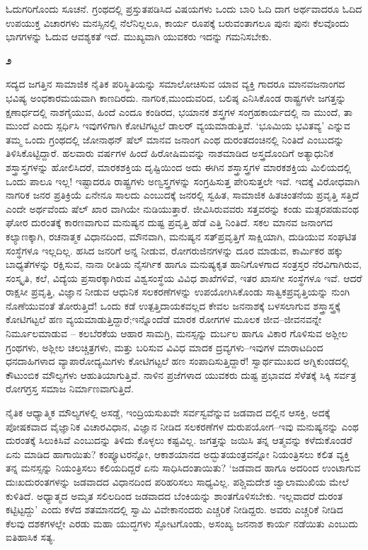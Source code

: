 ಓದುಗರಿಗೊಂದು ಸೂಚನೆ. ಗ್ರಂಥದಲ್ಲಿ ಪ್ರಸ್ತುತಪಡಿಸಿದ ವಿಷಯಗಳು ಒಂದು ಬಾರಿ ಓದಿ ದಾಗ ಅರ್ಥವಾದರೂ ಓದಿದ ಉಪಯುಕ್ತ ವಿಚಾರಗಳು ಮನಸ್ಸಿನಲ್ಲಿ ನೆಲೆನಿಲ್ಲಲೂ, ಕಾರ್ಯ ರೂಪಕ್ಕೆ ಬರುವಂತಾಗಲೂ ಪುನಃ ಪುನಃ ಕೆಲವೊಂದು ಭಾಗಗಳನ್ನು ಓದುವ ಆವಶ್ಯಕತೆ ಇದೆ. ಮುಖ್ಯವಾಗಿ ಯುವಕರು ಇದನ್ನು ಗಮನಿಸಬೇಕು.

\medskip\centerline{{\Large\bfseries ೨}}

ಸದ್ಯದ ಜಗತ್ತಿನ ಸಾಮಾಜಿಕ ನೈತಿಕ ಪರಿಸ್ಥಿತಿಯನ್ನು ಸಮಾಲೋಚಿಸುವ ಯಾವ ವ್ಯಕ್ತಿ ಗಾದರೂ ಮಾನವಜನಾಂಗದ ಭವಿಷ್ಯ ಅಂಧಕಾರಮಯವಾಗಿ ಕಾಣದಿರದು. ನಾಗರಿಕ,\break ಮುಂದುವರಿದ, ಬಲಿಷ್ಠ ಎನಿಸಿಕೊಂಡ ರಾಷ್ಟ್ರಗಳೇ ಜಗತ್ತನ್ನು ಕ್ಷಣಾರ್ಧದಲ್ಲಿ ನಾಶಗೈಯುವ, ಹಿಂದೆ ಎಂದೂ ಕಂಡಿರದ, ಭಯಾನಕ ಶಸ್ತ್ರಗಳ ಸಂಗ್ರಹಕಾರ್ಯದಲ್ಲಿ ನಾ ಮುಂದೆ, ತಾ ಮುಂದೆ ಎಂದು ಸ್ಪರ್ಧಿಸಿ ಇವುಗಳಿಗಾಗಿ ಕೋಟಿಗಟ್ಟಲೆ ಡಾಲರ್ ವ್ಯಯಮಾಡುತ್ತಿವೆ. ‘ಭೂಮಿಯ ಭವಿತವ್ಯ’ ಎನ್ನುವ ತಮ್ಮ ಒಂದು ಗ್ರಂಥದಲ್ಲಿ ಜೋನಾಥನ್ ಷೆಲ್ ಮಾನವ ಜನಾಂಗ ಎಂಥ ದುರಂತದಂಚಿನಲ್ಲಿ ನಿಂತಿದೆ ಎಂಬುದನ್ನು ತಿಳಿಸಿಕೊಟ್ಟಿದ್ದಾರೆ. ಹಲವಾರು ವರ್ಷಗಳ ಹಿಂದೆ ಹಿರೋಷಿಮವನ್ನು ನಾಶಮಾಡಿದ ಅಸ್ತ್ರದೊಂದಿಗೆ ಅತ್ಯಾಧುನಿಕ ಶಸ್ತ್ರಾಸ್ತ್ರಗಳನ್ನು ಹೋಲಿಸಿದರೆ, ಮಾರಕಶಕ್ತಿಯ ದೃಷ್ಟಿಯಿಂದ ಅದು ಈಗಿನ ಶಸ್ತ್ರಾಸ್ತ್ರಗಳ ಮಾರಕಶಕ್ತಿಯ ಮಿಲಿಯದಲ್ಲಿ ಒಂದು ಪಾಲೂ ಇಲ್ಲ! ಇಷ್ಟಾದರೂ ರಾಷ್ಟ್ರಗಳು ಅಣ್ವಸ್ತ್ರಗಳನ್ನು ಸಂಗ್ರಹಿಸುತ್ತ ಪೇರಿಸುತ್ತಲೇ ಇವೆ. ಇದಕ್ಕೆ ವಿರೋಧವಾಗಿ ನಾಗರಿಕ ಜನರ ಪ್ರತಿಕ್ರಿಯೆ ಏನೇನೂ ಸಾಲದು ಎಂಬುದಕ್ಕೆ ಜನರಲ್ಲಿ ಸ್ವಹಿತ, ಸಾಮಾಜಿಕ ಹಿತಚಿಂತನೆಯ ಪ್ರವೃತ್ತಿ ಸತ್ತಿದೆ ಎಂದೇ ಅರ್ಥವೆಂದು ಷೆಲ್ ಖಾರ ವಾಗಿಯೇ ನುಡಿಯುತ್ತಾರೆ. ಜೀವಿಸಿರುವವರು ಸತ್ತವರನ್ನು ಕಂಡು ಮತ್ಸರಪಡುವಂಥ ಘೋರ ದುರಂತಕ್ಕೆ ಕಾರಣವಾಗುವ ಮನುಷ್ಯನ ದುಷ್ಟ ಪ್ರವೃತ್ತಿ ಹೆಡೆ ಎತ್ತಿ ನಿಂತಿದೆ. ಸಕಲ ಮಾನವ ಜನಾಂಗದ ಕಲ್ಯಾಣಕ್ಕಾಗಿ, ರಚನಾತ್ಮಕ ವಿಧಾನದಿಂದ, ಮೌನವಾಗಿ, ಮನುಷ್ಯನ ಸತ್​ಪ್ರವೃತ್ತಿಗೆ ಸಾಕ್ಷಿಯಾಗಿ, ದುಡಿಯುವ ಸಂಘಟಿತ ಸಂಸ್ಥೆಗಳೂ ಇಲ್ಲದಿಲ್ಲ. ಹಸಿದ ಜನರಿಗೆ ಅನ್ನ ನೀಡುವ, ರೋಗರುಜಿನಗಳನ್ನು ದೂರ ಮಾಡುವ, ಕಾರ್ಮಿಕರ ಹಕ್ಕು ಬಾಧ್ಯತೆಗಳನ್ನು ರಕ್ಷಿಸುವ, ನಾನಾ ರೀತಿಯ ನೈಸರ್ಗಿಕ ಹಾಗೂ ಮನುಷ್ಯಕೃತ ಹಾನಿಗೊಳಗಾದ ಸಂತ್ರಸ್ತರ ನೆರವಿಗಾಗಿರುವ, ಸಂಸ್ಕೃತಿ, ಕಲೆ, ವಿದ್ಯೆಯ ಪ್ರಸಾರಕ್ಕಾಗಿರುವ ವಿಶ್ವಸಂಸ್ಥೆಯ ವಿವಿಧ ಶಾಖೆಗಳಿವೆ, ಇತರ ಖಾಸಗೀ ಸಂಸ್ಥೆಗಳೂ ಇವೆ. ಆದರೆ ರಾಕ್ಷಸೀ ಪ್ರವೃತ್ತಿ, ವಿಜ್ಞಾನ ನೀಡುವ ಆಧುನಿಕ ಸಲಕರಣೆಗಳನ್ನು ಉಪಯೋಗಿಸಿಕೊಂಡು ಸಾತ್ವಿಕಪ್ರವೃತ್ತಿಯನ್ನು ನುಂಗಿ ನೊಣೆಯುವಂತೆ ತೋರುತ್ತಿದೆ! ಒಂದು ಕಡೆ ಉತ್ಪತ್ತಿದಾಯಕವಲ್ಲದ ಕೇವಲ ಜನನಾಶಕ್ಕೆ ಬಳಸಲಾಗುವ ಶಸ್ತ್ರಾಸ್ತ್ರಕ್ಕೆ ಕೋಟಿಗಟ್ಟಲೆ ಹಣ ವ್ಯಯಮಾಡುತ್ತಿದ್ದಾರೆ;\break ಇನ್ನೊಂದೆಡೆ ಮಾರಕ ರೋಗಗಳ ಮೂಲಕ ಜೀವ–ಜೀವನವನ್ನೇ ನಿರ್ಮೂಲಮಾಡುವ – ಕಲ\-ಬೆರ\-ಕೆಯ ಆಹಾರ ಸಾಮಗ್ರಿ, ಮನಸ್ಸನ್ನು ದುರ್ಬಲ ಹಾಗೂ ವಿಕಾರ ಗೊಳಿಸುವ ಅಶ್ಲೀಲ ಗ್ರಂಥಗಳು, ಅಶ್ಲೀಲ ಚಲಚ್ಚಿತ್ರಗಳು, ಮತ್ತು ಬರಿಸುವ ವಿವಿಧ ಮಾದಕ ದ್ರವ್ಯಗಳು–ಇವುಗಳ ಮಾರಾಟದಿಂದ ಧನದಾಹಿಗಳಾದ ವ್ಯಾಪಾರೋದ್ಯಮಿಗಳು ಕೋಟಿಗಟ್ಟಲೆ ಹಣ ಸಂಪಾದಿಸುತ್ತಿದ್ದಾರೆ! ಸ್ವಾರ್ಥಮುಖದ ಅಗ್ನಿಕುಂಡದಲ್ಲಿ ಕೌಟುಂಬಿಕ ಮೌಲ್ಯಗಳು ಆಹುತಿಯಾಗುತ್ತಿವೆ. ನಾಳಿನ ಪ್ರಜೆಗಳಾದ ಯುವಕರು ದುಷ್ಟ ಪ್ರಭಾವದ ಸೆಳೆತಕ್ಕೆ ಸಿಕ್ಕಿ ಸರ್ವತ್ರ ರೋಗಗ್ರಸ್ತ ಸಮಾಜ ನಿರ್ಮಾಣವಾಗುತ್ತಿದೆ.

ನೈತಿಕ ಆಧ್ಯಾತ್ಮಿಕ ಮೌಲ್ಯಗಳಲ್ಲಿ ಅಸಡ್ಡೆ, ಇಂದ್ರಿಯಸುಖವೇ ಸರ್ವಸ್ವವೆನ್ನುವ ಜಡವಾದ ದಲ್ಲಿನ ಆಸಕ್ತಿ, ಅದಕ್ಕೆ ಪೋಷಕವಾದ ವೈಜ್ಞಾನಿಕ ವಿಚಾರವಿಧಾನ, ವಿಜ್ಞಾನ ನೀಡಿದ ಸಲಕರಣೆಗಳ ದುರುಪಯೋಗ–ಇವು ಮನುಷ್ಯನನ್ನು ಎಂಥ ದುರಂತಕ್ಕೆ ಸಿಲುಕಿಸಿವೆ ಎಂಬುದನ್ನು ತಿಳಿದು ಕೊಳ್ಳಲು ಕಷ್ಟವಿಲ್ಲ. ಜಗತ್ತನ್ನು ಜಯಿಸಿ ತನ್ನ ಆತ್ಮವನ್ನು ಕಳೆದುಕೊಂಡರೆ ಏನು ಮಾಡಿದ ಹಾಗಾಯಿತು? ಕಂಪ್ಯೂಟರನ್ನೋ, ಆಕಾಶಯಾನದ ಅದ್ಭುತಯಂತ್ರವನ್ನೋ ನಿಯಂತ್ರಿಸಲು ಕಲಿತ ವ್ಯಕ್ತಿ ತನ್ನ ಮನಸ್ಸನ್ನು ನಿಯಂತ್ರಿಸಲು ಕಲಿಯದಿದ್ದರೆ ಏನು ಸಾಧಿಸಿದಂತಾಯಿತು? ‘ಜಡವಾದ ಹಾಗೂ ಅದರಿಂದ ಉಂಟಾಗುವ ದುಃಖದುರಂತಗಳನ್ನು ಜಡವಾದದ ವಿಧಾನದಿಂದ ಪರಿಹರಿಸಲು ಸಾಧ್ಯವಿಲ್ಲ. ಪಶ್ಚಿಮದೇಶ ಜ್ವಾಲಾಮುಖಿಯ ಮೇಲೆ ಕುಳಿತಿದೆ. ಅಧ್ಯಾತ್ಮದ ಅಮೃತ ಸಲಿಲದಿಂದ ಜಡವಾದದ ಬೆಂಕಿಯನ್ನು ಶಾಂತಗೊಳಿಸಬೇಕು. ಇಲ್ಲವಾದರೆ ದುರಂತ ಕಟ್ಟಿಟ್ಟದ್ದು’ ಎಂದು ಕಳೆದ ಶತಮಾನದಲ್ಲಿ ಸ್ವಾಮಿ ವಿವೇಕಾನಂದರು ಎಚ್ಚರಿಕೆ ನೀಡಿದ್ದರು. ಅವರು ಎಚ್ಚರಿಕೆ ನೀಡಿದ ಕೆಲವು ದಶಕಗಳಲ್ಲೇ ಎರಡು ಮಹಾ ಯುದ್ಧಗಳು ಸ್ಫೋಟಗೊಂಡು, ಅಸಂಖ್ಯ ಜನನಾಶ ಕಾರ್ಯ ನಡೆಯಿತು ಎಂಬುದು ಐತಿಹಾಸಿಕ ಸತ್ಯ.

